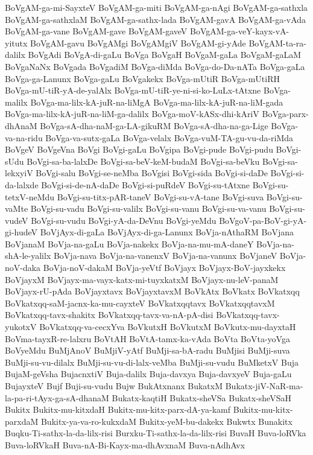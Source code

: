 {BoVgAM-ga-mi-SayxteV
BoVgAM-ga-miti
BoVgAM-ga-nAgi
BoVgAM-ga-sathxla
BoVgAM-ga-sathxlaM
BoVgAM-ga-sathx-lada
BoVgAM-gavA
BoVgAM-ga-vAda
BoVgAM-ga-vane
BoVgAM-gave
BoVgAM-gaveV
BoVgAM-ga-veY-kayx-vA-yitutx
BoVgAM-gavu
BoVgAMgi
BoVgAMgiV
BoVgAM-gi-yAde
BoVgAM-ta-ra-dalilx
BoVgAdi
BoVgA-di-gaLu
BoVga
BoVgaH
BoVgaM-gaLa
BoVgaM-gaLaM
BoVgaNaNx
BoVgada
BoVgadiM
BoVga-diMda
BoVga-do-Da-nATa
BoVga-gaLa
BoVga-ga-Lanunx
BoVga-gaLu
BoVgakekx
BoVga-mUtiR
BoVga-mUtiRH
BoVga-mU-tiR-yA-de-yalAlx
BoVga-mU-tiR-ye-ni-si-ko-LuLx-tAtxne
BoVga-malilx
BoVga-ma-lilx-kA-juR-na-liMgA
BoVga-ma-lilx-kA-juR-na-liM-gada
BoVga-ma-lilx-kA-juR-na-liM-ga-dalilx
BoVga-moV-kASx-dhi-kAriV
BoVga-parx-dhAnaM
BoVga-sA-dha-naM-ga-LA-gikuRM
BoVga-sA-dha-na-ga-Lige
BoVga-va-na-ridu
BoVga-va-sutx-gaLa
BoVga-velalx
BoVga-vuM-TA-gu-vu-da-riMda
BoVgeV
BoVgeVna
BoVgi
BoVgi-gaLu
BoVgipa
BoVgi-pude
BoVgi-pudu
BoVgi-sUdu
BoVgi-sa-ba-lalxDe
BoVgi-sa-beV-keM-budaM
BoVgi-sa-beVku
BoVgi-sa-lekxyiV
BoVgi-salu
BoVgi-se-neMba
BoVgisi
BoVgi-sida
BoVgi-si-daDe
BoVgi-si-da-lalxde
BoVgi-si-de-nA-daDe
BoVgi-si-puRdeV
BoVgi-su-tAtxne
BoVgi-su-tetxV-neMdu
BoVgi-su-titx-pAR-taneV
BoVgi-su-vA-tane
BoVgi-suva
BoVgi-su-vaMte
BoVgi-su-vadu
BoVgi-su-valilx
BoVgi-su-vanu
BoVgi-su-va-vanu
BoVgi-su-vudeV
BoVgi-su-vudu
BoVgi-yA-da-DeVnu
BoVgi-yeMdu
BoVgoV-pa-BoV-gi-yA-gi-hudeV
BoVjAyx-di-gaLa
BoVjAyx-di-ga-Lanunx
BoVja-nAthaRM
BoVjana
BoVjanaM
BoVja-na-gaLu
BoVja-nakekx
BoVja-na-mu-mA-daneY
BoVja-na-shA-le-yalilx
BoVja-nava
BoVja-na-vanenxV
BoVja-na-vanunx
BoVjaneV
BoVja-noV-daka
BoVja-noV-dakaM
BoVja-yeVtf
BoVjayx
BoVjayx-BoV-jayxkekx
BoVjayxM
BoVjayx-ma-vayx-katx-mi-tuyxkatxM
BoVjayx-nu-leV-panaM
BoVjayx-rU-pAda
BoVjayxtavx
BoVjayxtavxM
BoVkAtx
BoVkatx
BoVkatxqq
BoVkatxqq-saM-jacnx-ka-mu-cayxteV
BoVkatxqqtavx
BoVkatxqqtavxM
BoVkatxqq-tavx-shakitx
BoVkatxqq-tavx-va-nA-pA-disi
BoVkatxqq-tavx-yukotxV
BoVkatxqq-va-cecxYva
BoVkutxH
BoVkutxM
BoVkutx-mu-dayxtaH
BoVma-tayxR-re-lalxru
BoVtAH
BoVtA-tamx-ka-vAda
BoVta
BoVta-yoVga
BoVyeMdu
BuMjAnoV
BuMjiV-yAtf
BuMji-sa-bA-radu
BuMjisi
BuMji-suva
BuMji-su-vu-dilalx
BuMji-su-vu-di-lalx-veMba
BuMji-su-vudu
BuMketxV
Buja
BujaM-geVsha
BujacnxtiV
Buja-dalilx
Buja-davxya
Buja-davxyeV
Buja-gaLu
BujayxteV
Bujf
Buji-su-vudu
Bujw
BukAtxnanx
BukatxM
Bukatx-jiV-NaR-ma-la-pa-ri-tAyx-ga-sA-dhanaM
Bukatx-kaqtiH
Bukatx-sheVSa
Bukatx-sheVSaH
Bukitx
Bukitx-mu-kitxdaH
Bukitx-mu-kitx-parx-dA-ya-kamf
Bukitx-mu-kitx-parxdaM
Bukitx-ya-va-ro-kukxdaM
Bukitx-yeM-bu-dakekx
Bukwtx
Bunakitx
Buqku-Ti-sathx-la-da-lilx-risi
Burxku-Ti-sathx-la-da-lilx-risi
BuvaH
Buva-loRVka
Buva-loRVkaH
Buva-nA-Bi-Kayx-ma-dhAvxnaM
Buva-nAdhAvx
}
